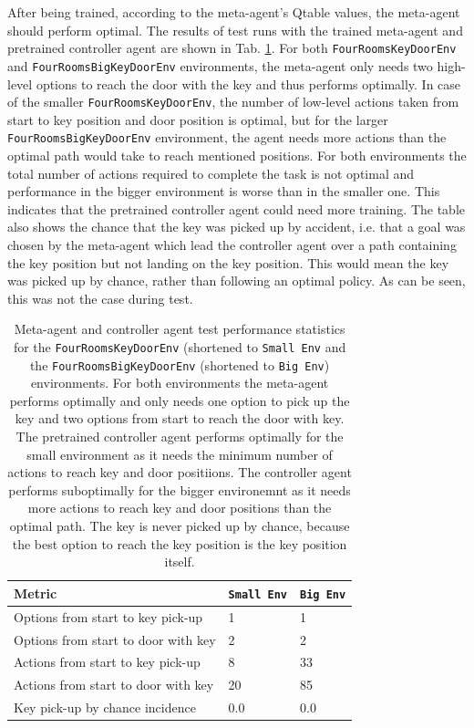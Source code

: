 \documentclass[conference]{IEEEtran}
\begin{document}
After being trained, according to the meta-agent's Qtable values, the meta-agent should perform optimal. The results of test runs with the trained meta-agent and pretrained controller agent are shown in Tab. \ref{tab:exp_option_her_test}. For both \texttt{FourRoomsKeyDoorEnv} and \texttt{FourRoomsBigKeyDoorEnv} environments, the meta-agent only needs two high-level options to reach the door with the key and thus performs optimally. In case of the smaller \texttt{FourRoomsKeyDoorEnv}, the number of low-level actions taken from start to key position and door position is optimal, but for the larger \texttt{FourRoomsBigKeyDoorEnv} environment, the agent needs more actions than the optimal path would take to reach mentioned positions. For both environments the total number of actions required to complete the task is not optimal and performance in the bigger environment is worse than in the smaller one. This indicates that the pretrained controller agent could need more training. The table also shows the chance that the key was picked up by accident, i.e. that a goal was chosen by the meta-agent which lead the controller agent over a path containing the key position but not landing on the key position. This would mean the key was picked up by chance, rather than following an optimal policy. As can be seen, this was not the case during test.

\begin{table}[ht]
\centering
\begin{tabular}{|l|l|l|}
  \hline
  Metric & \texttt{Small Env} & \texttt{Big Env} \\
  \hline
  Options from start to key pick-up   & 1 & 1 \\
  Options from start to door with key & 2 & 2 \\
  Actions from start to key pick-up   & 8 & 33 \\
  Actions from start to door with key & 20 & 85 \\
  Key pick-up by chance incidence     & 0.0 & 0.0 \\
  \hline
\end{tabular}
\caption{Meta-agent and controller agent test performance statistics for the \texttt{FourRoomsKeyDoorEnv} (shortened to \texttt{Small Env} and the \texttt{FourRoomsBigKeyDoorEnv} (shortened to \texttt{Big Env}) environments. For both environments the meta-agent performs optimally and only needs one option to pick up the key and two options from start to reach the door with key. The pretrained controller agent performs optimally for the small environment as it needs the minimum number of actions to reach key and door positiions. The controller agent performs suboptimally for the bigger environemnt as it needs more actions to reach key and door positions than the optimal path. The key is never picked up by chance, because the best option to reach the key position is the key position itself.}
\label{tab:exp_option_her_test}
\end{table}
\end{document}
